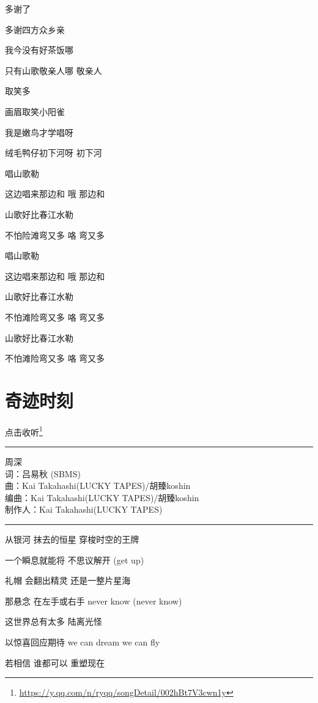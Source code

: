 \documentclass[]{ctexbook}
\renewcommand{\href}[2]{#2\footnote{\url{#1}}}
\begin{document}
多谢了

多谢四方众乡亲

我今没有好茶饭哪

只有山歌敬亲人哪 敬亲人

取笑多

画眉取笑小阳雀

我是嫩鸟才学唱呀

绒毛鸭仔初下河呀 初下河

唱山歌勒

这边唱来那边和 哦 那边和

山歌好比春江水勒

不怕险滩弯又多 咯 弯又多

唱山歌勒

这边唱来那边和 哦 那边和

山歌好比春江水勒

不怕滩险弯又多 咯 弯又多

山歌好比春江水勒

不怕滩险弯又多 咯 弯又多

\section*{奇迹时刻}\label{magic-moment}


\href{https://y.qq.com/n/ryqq/songDetail/002hBt7V3cwn1y}{点击收听}

\begin{center}\rule{0.5\linewidth}{0.5pt}\end{center}

周深\\
词：吕易秋 (SBMS)\\
曲：Kai Takahashi(LUCKY TAPES)/胡臻koshin\\
编曲：Kai Takahashi(LUCKY TAPES)/胡臻koshin\\
制作人：Kai Takahashi(LUCKY TAPES)

\begin{center}\rule{0.5\linewidth}{0.5pt}\end{center}

从银河 抹去的恒星 穿梭时空的王牌

一个瞬息就能将 不思议解开 (get up)

礼帽 会翻出精灵 还是一整片星海

那悬念 在左手或右手 never know (never know)

这世界总有太多 陆离光怪

以惊喜回应期待 we can dream we can fly

若相信 谁都可以 重塑现在
\end{document}
